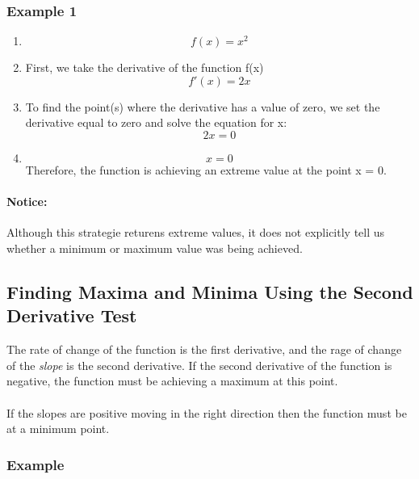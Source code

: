 \documentclass[a4paper,11pt]{book}
\begin{document}
\subsubsection{Example 1}
\begin{enumerate}
  \LARGE
  \item \[ f(x) = x^2 \]
  \item \normalsize First, we take the derivative of the function f(x) \LARGE \[ f'(x) = 2x \]
  \item \normalsize To find the point(s) where the derivative has a value of zero, we set the derivative equal to zero and solve the equation for x: \LARGE \[ 2x = 0 \]
  \item \[ x = 0 \]
\normalsize  
Therefore, the function is achieving an extreme value at the point x = 0.
\end{enumerate}

\paragraph{Notice:}
Although this strategie returens extreme values, it does not explicitly tell us whether a minimum or maximum value was being achieved.

\subsection{Finding Maxima and Minima Using the Second Derivative Test}

The rate of change of the function is the first derivative, and the rage of change of the \textit{slope} is the second derivative. If the second derivative of the function is negative, the function must be achieving a maximum at this point. \\ \\ If the slopes are positive moving in the right direction then the function must be at a minimum point.

\subsubsection{Example}
\end{document}
